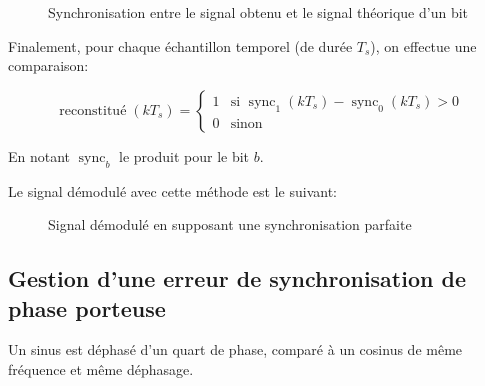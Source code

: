 \documentclass{article}
\begin{document}
\begin{center}
\begin{figure}[H]
	\centering
	\caption{Synchronisation entre le signal obtenu et le signal théorique d'un bit}
\end{figure}
\end{center}

Finalement, pour chaque échantillon temporel (de durée $T_s$), on effectue une comparaison:

$$
\operatorname{reconstitué}(kT_s) = \begin{cases}
    1 & \text{si } \operatorname{sync}_1(kT_s) - \operatorname{sync}_0(kT_s) > 0 \\
    0 & \text{sinon}
\end{cases}
$$

En notant $\operatorname{sync}_b$ le produit pour le bit $b$.

Le signal démodulé avec cette méthode est le suivant:


\begin{figure}
\end{figure}

\begin{figure}[H]
	\centering

	\caption{Signal démodulé en supposant une synchronisation parfaite}
	\label{fig:synchro-parfaite}
\end{figure}



\subsection{Gestion d'une erreur de synchronisation de phase porteuse}

Un sinus est déphasé d'un quart de phase, comparé à un cosinus de même fréquence et même déphasage.
\end{document}

